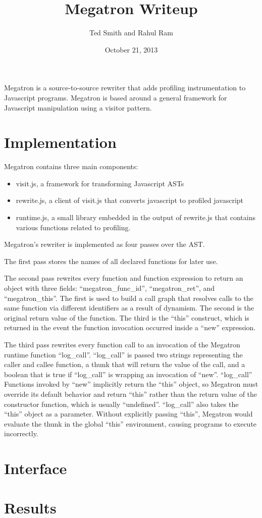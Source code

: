 \documentclass{article}
\begin{document}
\title{Megatron Writeup}
\author{Ted Smith and Rahul Ram}
\date{October 21, 2013}

\maketitle

Megatron is a source-to-source rewriter that adds profiling
instrumentation to Javascript programs.  
Megatron is based around a general framework for Javascript
manipulation using a visitor pattern.

\section{Implementation}

Megatron contains three main components:

\begin{itemize}
\item visit.js, a framework for transforming Javascript ASTs
\item rewrite.js, a client of visit.js that converts javascript to
  profiled javascript
\item runtime.js, a small library embedded in the output of rewrite.js
  that contains various functions related to profiling.
\end{itemize}

Megatron's rewriter is implemented as four passes over the AST.

The first pass stores the names of all declared functions for later
use.

The second pass rewrites every function and function expression to
return an object with three fields: ``megatron_func_id'',
``megatron_ret'', and ``megatron_this''. The first is used to build a
call graph that resolves calls to the same function via different
identifiers as a result of dynamism. The second is the original return
value of the function. The third is the ``this'' construct, which is
returned in the event the function invocation occurred inside a
``new'' expression.

The third pass rewrites every function call to an invocation of the
Megatron runtime function ``log_call''. ``log_call'' is passed two
strings representing the caller and callee function, a thunk that will
return the value of the call, and a boolean that is true if
``log_call'' is wrapping an invocation of ``new''. ``log_call''
Functions invoked by ``new'' implicitly return the ``this'' object, so
Megatron must override its default behavior and return ``this'' rather
than the return value of the constructor function, which is usually
``undefined''. ``log_call'' also takes the ``this'' object as a
parameter. Without explicitly passing ``this'', Megatron would
evaluate the thunk in the global ``this'' environment, causing
programs to execute incorrectly.

\section{Interface}

\section{Results}
\end{document}

